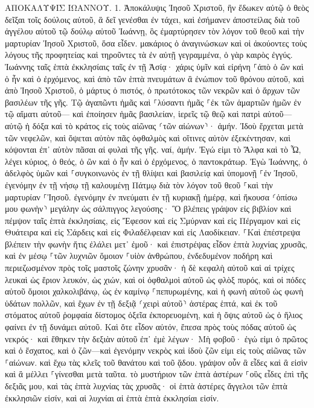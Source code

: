 \documentclass[twoside, 9pt]{extreport}
\begin{document}
ΑΠΟΚΑΛΥΨΙΣ ΙΩΑΝΝΟΥ.
1.
Ἀποκάλυψις Ἰησοῦ Χριστοῦ, ἣν ἔδωκεν αὐτῷ ὁ θεὸς δεῖξαι τοῖς δούλοις αὐτοῦ, ἃ δεῖ γενέσθαι ἐν τάχει, καὶ ἐσήμανεν ἀποστείλας διὰ τοῦ ἀγγέλου αὐτοῦ τῷ δούλῳ αὐτοῦ Ἰωάννῃ, 
ὃς ἐμαρτύρησεν τὸν λόγον τοῦ θεοῦ καὶ τὴν μαρτυρίαν Ἰησοῦ Χριστοῦ, ὅσα εἶδεν. 
μακάριος ὁ ἀναγινώσκων καὶ οἱ ἀκούοντες τοὺς λόγους τῆς προφητείας καὶ τηροῦντες τὰ ἐν αὐτῇ γεγραμμένα, ὁ γὰρ καιρὸς ἐγγύς. 
Ἰωάννης ταῖς ἑπτὰ ἐκκλησίαις ταῖς ἐν τῇ Ἀσίᾳ· χάρις ὑμῖν καὶ εἰρήνη ⸀ἀπὸ ὁ ὢν καὶ ὁ ἦν καὶ ὁ ἐρχόμενος, καὶ ἀπὸ τῶν ἑπτὰ πνευμάτων ἃ ἐνώπιον τοῦ θρόνου αὐτοῦ, 
καὶ ἀπὸ Ἰησοῦ Χριστοῦ, ὁ μάρτυς ὁ πιστός, ὁ πρωτότοκος τῶν νεκρῶν καὶ ὁ ἄρχων τῶν βασιλέων τῆς γῆς. Τῷ ἀγαπῶντι ἡμᾶς καὶ ⸀λύσαντι ἡμᾶς ⸀ἐκ τῶν ἁμαρτιῶν ἡμῶν ἐν τῷ αἵματι αὐτοῦ— 
καὶ ἐποίησεν ἡμᾶς βασιλείαν, ἱερεῖς τῷ θεῷ καὶ πατρὶ αὐτοῦ—αὐτῷ ἡ δόξα καὶ τὸ κράτος εἰς τοὺς αἰῶνας ⸂τῶν αἰώνων⸃· ἀμήν. 
Ἰδοὺ ἔρχεται μετὰ τῶν νεφελῶν, καὶ ὄψεται αὐτὸν πᾶς ὀφθαλμὸς καὶ οἵτινες αὐτὸν ἐξεκέντησαν, καὶ κόψονται ἐπ᾽ αὐτὸν πᾶσαι αἱ φυλαὶ τῆς γῆς. ναί, ἀμήν. 
Ἐγώ εἰμι τὸ Ἄλφα καὶ τὸ Ὦ, λέγει κύριος, ὁ θεός, ὁ ὢν καὶ ὁ ἦν καὶ ὁ ἐρχόμενος, ὁ παντοκράτωρ. 
Ἐγὼ Ἰωάννης, ὁ ἀδελφὸς ὑμῶν καὶ ⸀συγκοινωνὸς ἐν τῇ θλίψει καὶ βασιλείᾳ καὶ ὑπομονῇ ⸀ἐν Ἰησοῦ, ἐγενόμην ἐν τῇ νήσῳ τῇ καλουμένῃ Πάτμῳ διὰ τὸν λόγον τοῦ θεοῦ ⸀καὶ τὴν μαρτυρίαν ⸀Ἰησοῦ. 
ἐγενόμην ἐν πνεύματι ἐν τῇ κυριακῇ ἡμέρᾳ, καὶ ἤκουσα ⸂ὀπίσω μου φωνὴν⸃ μεγάλην ὡς σάλπιγγος 
λεγούσης· Ὃ βλέπεις γράψον εἰς βιβλίον καὶ πέμψον ταῖς ἑπτὰ ἐκκλησίαις, εἰς Ἔφεσον καὶ εἰς Σμύρναν καὶ εἰς Πέργαμον καὶ εἰς Θυάτειρα καὶ εἰς Σάρδεις καὶ εἰς Φιλαδέλφειαν καὶ εἰς Λαοδίκειαν. 
⸀Καὶ ἐπέστρεψα βλέπειν τὴν φωνὴν ἥτις ἐλάλει μετ᾽ ἐμοῦ· καὶ ἐπιστρέψας εἶδον ἑπτὰ λυχνίας χρυσᾶς, 
καὶ ἐν μέσῳ ⸀τῶν λυχνιῶν ὅμοιον ⸀υἱὸν ἀνθρώπου, ἐνδεδυμένον ποδήρη καὶ περιεζωσμένον πρὸς τοῖς μαστοῖς ζώνην χρυσᾶν· 
ἡ δὲ κεφαλὴ αὐτοῦ καὶ αἱ τρίχες λευκαὶ ὡς ἔριον λευκόν, ὡς χιών, καὶ οἱ ὀφθαλμοὶ αὐτοῦ ὡς φλὸξ πυρός, 
καὶ οἱ πόδες αὐτοῦ ὅμοιοι χαλκολιβάνῳ, ὡς ἐν καμίνῳ ⸀πεπυρωμένης, καὶ ἡ φωνὴ αὐτοῦ ὡς φωνὴ ὑδάτων πολλῶν, 
καὶ ἔχων ἐν τῇ δεξιᾷ ⸂χειρὶ αὐτοῦ⸃ ἀστέρας ἑπτά, καὶ ἐκ τοῦ στόματος αὐτοῦ ῥομφαία δίστομος ὀξεῖα ἐκπορευομένη, καὶ ἡ ὄψις αὐτοῦ ὡς ὁ ἥλιος φαίνει ἐν τῇ δυνάμει αὐτοῦ. 
Καὶ ὅτε εἶδον αὐτόν, ἔπεσα πρὸς τοὺς πόδας αὐτοῦ ὡς νεκρός· καὶ ἔθηκεν τὴν δεξιὰν αὐτοῦ ἐπ᾽ ἐμὲ λέγων· Μὴ φοβοῦ· ἐγώ εἰμι ὁ πρῶτος καὶ ὁ ἔσχατος, 
καὶ ὁ ζῶν—καὶ ἐγενόμην νεκρὸς καὶ ἰδοὺ ζῶν εἰμι εἰς τοὺς αἰῶνας τῶν ⸀αἰώνων. καὶ ἔχω τὰς κλεῖς τοῦ θανάτου καὶ τοῦ ᾅδου. 
γράψον οὖν ἃ εἶδες καὶ ἃ εἰσὶν καὶ ἃ μέλλει ⸀γίνεσθαι μετὰ ταῦτα. 
τὸ μυστήριον τῶν ἑπτὰ ἀστέρων ⸀οὓς εἶδες ἐπὶ τῆς δεξιᾶς μου, καὶ τὰς ἑπτὰ λυχνίας τὰς χρυσᾶς· οἱ ἑπτὰ ἀστέρες ἄγγελοι τῶν ἑπτὰ ἐκκλησιῶν εἰσίν, καὶ αἱ λυχνίαι αἱ ἑπτὰ ἑπτὰ ἐκκλησίαι εἰσίν. 
\end{document}

